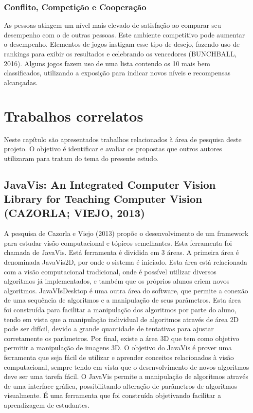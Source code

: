 \documentclass[
	12pt,				%
	oneside,			%
	a4paper,			%
	english,			%
	french,				%
	spanish,			%
	brazil,				%
	]{abntex2}
\begin{document}
\subsection{Conflito, Competição e Cooperação}                    

As pessoas atingem um nível mais elevado de satisfação ao comparar seu desempenho com o de outras pessoas. Este ambiente competitivo pode aumentar o desempenho. Elementos de jogos instigam esse tipo de desejo, fazendo uso de rankings para exibir os resultados e celebrando os vencedores  (BUNCHBALL, 2016). Alguns jogos fazem uso de uma lista contendo os 10 mais bem classificados, utilizando a exposição para indicar novos níveis e recompensas alcançadas.

\chapter{Trabalhos correlatos}

Neste capítulo são apresentados trabalhos relacionados à área de pesquisa deste projeto. O objetivo é identificar e avaliar os propostas que outros autores utilizaram para tratam do tema do presente estudo.

\section{JavaVis: An Integrated Computer Vision Library for Teaching Computer Vision (CAZORLA; VIEJO, 2013)}
	A pesquisa de Cazorla e Viejo (2013) propõe o desenvolvimento de um framework para estudar visão computacional e tópicos semelhantes. Esta ferramenta foi chamada de JavaVis. Está ferramenta é dividida em 3 áreas. A primeira área é denominada JavaVis2D, por onde o sistema é iniciado. Esta área está relacionada com a visão computacional tradicional, onde é possível utilizar diversos algoritmos já implementados, e também que os próprios alunos criem novos algoritmos. 
JavaVIsDesktop é uma outra área do software, que permite a conexão de uma sequência de algoritmos e a manipulação de seus parâmetros. Esta área foi construída para facilitar a manipulação dos algoritmos por parte do aluno, tendo em vista que a manipulação individual de algoritmos através de área 2D pode ser difícil, devido a grande quantidade de tentativas para ajustar corretamente os parâmetros. Por final, existe a área 3D que tem como objetivo permitir a manipulação de imagens 3D.
O objetivo do JavaVis é prover uma ferramenta que seja fácil de utilizar e aprender conceitos relacionados à visão computacional, sempre tendo em vista que o desenvolvimento de novos algoritmos deve ser uma tarefa fácil. O JavaVis permite a manipulação de algoritmos através de uma interface gráfica, possibilitando alteração de parâmetros de algoritmos visualmente. É uma ferramenta que foi construída objetivando facilitar a aprendizagem de estudantes.
\end{document}

